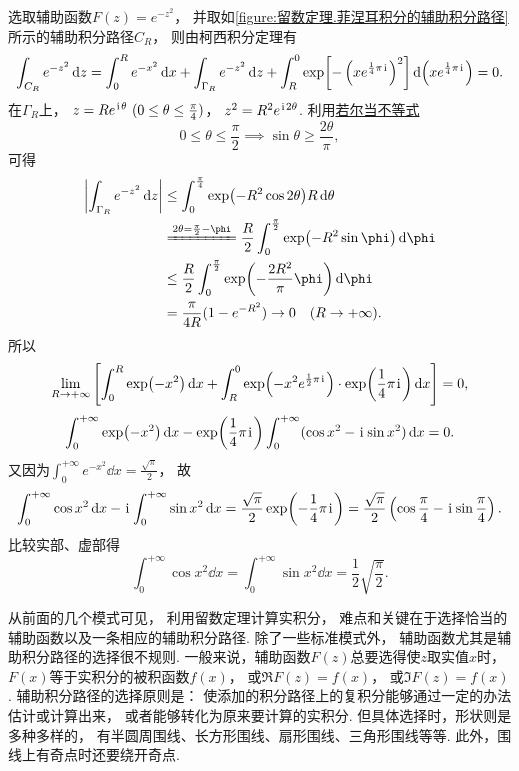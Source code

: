 \begin{example}
\begin{solution}
选取辅助函数\(F(z) = e^{-z^2}\)，
并取如\cref{figure:留数定理.菲涅耳积分的辅助积分路径} 所示的辅助积分路径\(C_R\)，
则由柯西积分定理有\[
	\int_{C_R} e^{-z^2} \dd{z}
	= \int_0^R e^{-x^2} \dd{x}
	+ \int_{\Gamma_R} e^{-z^2} \dd{z}
	+ \int_R^0 \exp[-\left(x e^{\frac{1}{4}\pi\kern1pt\mathrm{i}\kern1pt}\right)^2] \dd(x e^{\frac{1}{4}\pi\kern1pt\mathrm{i}\kern1pt})
	= 0.
\]
在\(\Gamma_R\)上，
\(z = R e^{\iu\theta}\ (0\leq\theta\leq\frac{\pi}{4})\)，
\(z^2 = R^2 e^{\kern1pt\mathrm{i}\kern1pt2\theta}\).
利用\hyperref[equation:微分中值定理.若尔当不等式]{若尔当不等式}\[
	0\leq\theta\leq\frac{\pi}{2}
	\implies
	\sin\theta\geq\frac{2\theta}{\pi},
\]
可得\begin{align*}
	\abs{\int_{\Gamma_R} e^{-z^2} \dd{z}}
	&\leq
	\int_0^{\frac{\pi}{4}} \exp(-R^2 \cos2\theta) R\dd{\theta} \\
	&\xlongequal{2\theta=\frac{\pi}{2}-\phi}
	\frac{R}{2} \int_0^{\frac{\pi}{2}} \exp(-R^2 \sin\phi) \dd{\phi} \\
	&\leq
	\frac{R}{2} \int_0^{\frac{\pi}{2}} \exp(-\frac{2R^2}{\pi}\phi) \dd{\phi} \\
	&= \frac{\pi}{4R} (1-e^{-R^2})
	\to0\quad(R\to+\infty).
\end{align*}
所以\[
	\lim_{R\to+\infty} \left[
		\int_0^R \exp(-x^2) \dd{x}
		+ \int_R^0 \exp(-x^2 e^{\frac{1}{2}\pi\kern1pt\mathrm{i}\kern1pt})
		\cdot \exp(\frac{1}{4}\pi\kern1pt\mathrm{i}\kern1pt) \dd{x}
	\right] = 0,
\]\[
	\int_0^{+\infty} \exp(-x^2) \dd{x}
	- \exp(\frac{1}{4}\pi\kern1pt\mathrm{i}\kern1pt)
	\int_0^{+\infty} (\cos x^2 - \kern1pt\mathrm{i}\kern1pt \sin x^2) \dd{x} = 0.
\]
又因为\(\int_0^{+\infty} e^{-x^2} \dd{x} = \frac{\sqrt{\pi}}{2}\)，
故\[
	\int_0^{+\infty} \cos x^2 \dd{x}
	- \kern1pt\mathrm{i}\kern1pt \int_0^{+\infty} \sin x^2 \dd{x}
	= \frac{\sqrt{\pi}}{2} \exp(-\frac{1}{4}\pi\kern1pt\mathrm{i}\kern1pt)
	= \frac{\sqrt{\pi}}{2} \left(\cos\frac{\pi}{4} - \kern1pt\mathrm{i}\kern1pt \sin\frac{\pi}{4}\right).
\]
比较实部、虚部得\begin{equation}\label{equation:留数定理.菲涅耳积分}
	\int_0^{+\infty} \cos x^2 \dd{x}
	= \int_0^{+\infty} \sin x^2 \dd{x}
	= \frac{1}{2} \sqrt{\frac{\pi}{2}}.
\end{equation}
\end{solution}
\end{example}

从前面的几个模式可见，
利用留数定理计算实积分，
难点和关键在于选择恰当的辅助函数以及一条相应的辅助积分路径.
除了一些标准模式外，
辅助函数尤其是辅助积分路径的选择很不规则.
一般来说，辅助函数\(F(z)\)总要选得使\(z\)取实值\(x\)时，
\(F(x)\)等于实积分的被积函数\(f(x)\)，
或\(\Re{F(z)} = f(x)\)，
或\(\Im{F(z)} = f(x)\).
辅助积分路径的选择原则是：
使添加的积分路径上的复积分能够通过一定的办法估计或计算出来，
或者能够转化为原来要计算的实积分.
但具体选择时，形状则是多种多样的，
有半圆周围线、长方形围线、扇形围线、三角形围线等等.
此外，围线上有奇点时还要绕开奇点.

